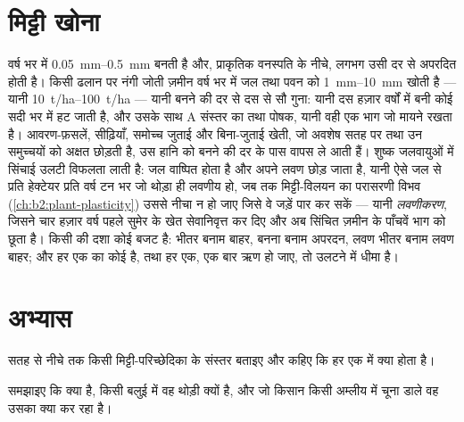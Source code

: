 \section{मिट्टी खोना}

\begin{proposition}\label{prop:b2:living-soil:erosion}
 वर्ष भर में \qtyrange{0.05}{0.5}{mm} बनती है और, प्राकृतिक
वनस्पति के नीचे, लगभग उसी दर से अपरदित होती है। किसी ढलान पर नंगी जोती
ज़मीन वर्ष भर में जल तथा पवन को \qtyrange{1}{10}{mm} खोती है ---
यानी \qtyrange{10}{100}{t/ha} --- यानी बनने की दर से
दस से सौ गुना: यानी दस हज़ार वर्षों में बनी कोई 
सदी भर में हट जाती है, और उसके साथ A संस्तर का  तथा पोषक,
यानी वही एक भाग जो मायने रखता है। आवरण-फ़सलें, सीढ़ियाँ, समोच्च जुताई
और बिना-जुताई खेती, जो अवशेष सतह पर तथा उन
समुच्चयों को अक्षत छोड़ती है, उस हानि को बनने की दर के पास वापस ले आती हैं।
शुष्क जलवायुओं में सिंचाई उलटी विफलता लाती है: जल
वाष्पित होता है और अपने लवण छोड़ जाता है, यानी ऐसे जल से प्रति हेक्टेयर प्रति वर्ष टन भर
जो थोड़ा ही लवणीय हो, जब तक मिट्टी-विलयन का परासरणी विभव
(\cref{ch:b2:plant-plasticity}) उससे नीचा न हो जाए जिसे वे
जड़ें पार कर सकें --- यानी \emph{लवणीकरण}, जिसने चार हज़ार वर्ष पहले
सुमेर के खेत सेवानिवृत्त कर दिए और अब सिंचित ज़मीन के
पाँचवें भाग को छूता है। किसी  की दशा कोई बजट है:  भीतर बनाम
 बाहर, बनना बनाम अपरदन, लवण भीतर बनाम लवण
बाहर; और हर एक का कोई  है, तथा हर एक, एक बार ऋण हो जाए, तो
उलटने में धीमा है।
\end{proposition}

\section{अभ्यास}

\begin{exercise}[$\star$]\label{exo:b2:living-soil:1}
सतह से नीचे तक किसी मिट्टी-परिच्छेदिका के संस्तर बताइए और कहिए
कि हर एक में क्या होता है।
\end{exercise}

\begin{exercise}[$\star$]\label{exo:b2:living-soil:2}
समझाइए कि  क्या है, किसी बलुई  में वह
थोड़ी क्यों है, और जो किसान किसी अम्लीय  में चूना डाले वह उसका क्या कर रहा है।
\end{exercise}

